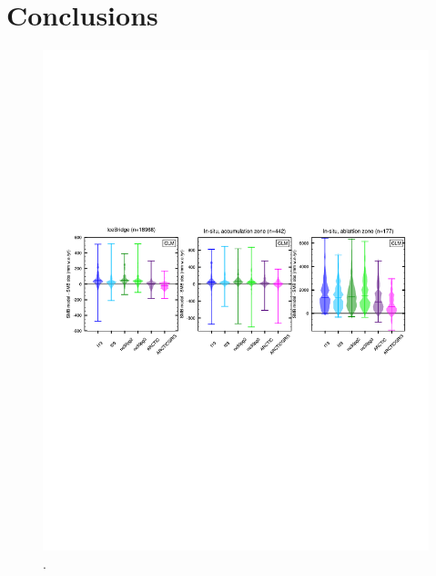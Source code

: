 \documentclass[draft]{agujournal2019}
\begin{document}
\section{Conclusions}\label{sec:conclusions}

\begin{figure}[t]
\begin{center}
         \includegraphics[width=130mm]{figs/temp_violens.pdf}
\end{center}
\caption{.}
\label{fig:pointdiff}
\end{figure}
\end{document}
